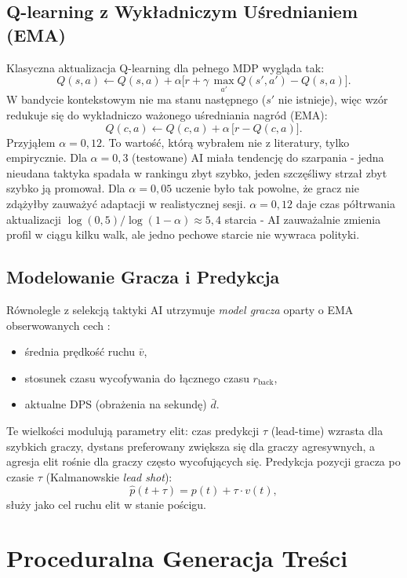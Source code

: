 \subsection{Q-learning z Wykładniczym Uśrednianiem (EMA)}

Klasyczna aktualizacja Q-learning \cite{sutton2018rl} dla pełnego MDP wygląda tak:
\[
    Q(s, a) \leftarrow Q(s, a) + \alpha \bigl[r + \gamma\, \max_{a'} Q(s', a') - Q(s, a)\bigr].
\]
W bandycie kontekstowym nie ma stanu następnego ($s'$ nie istnieje), więc wzór redukuje się do wykładniczo ważonego uśredniania nagród (EMA):
\[
    Q(c, a) \leftarrow Q(c, a) + \alpha\, \bigl[r - Q(c, a)\bigr].
\]
Przyjąłem $\alpha = 0{,}12$. To wartość, którą wybrałem nie z literatury, tylko empirycznie. Dla $\alpha = 0{,}3$ (testowane) AI miała tendencję do szarpania - jedna nieudana taktyka spadała w rankingu zbyt szybko, jeden szczęśliwy strzał zbyt szybko ją promował. Dla $\alpha = 0{,}05$ uczenie było tak powolne, że gracz nie zdążyłby zauważyć adaptacji w realistycznej sesji. $\alpha = 0{,}12$ daje czas półtrwania aktualizacji $\log(0{,}5)/\log(1-\alpha) \approx 5{,}4$ starcia - AI zauważalnie zmienia profil w ciągu kilku walk, ale jedno pechowe starcie nie wywraca polityki.

\subsection{Modelowanie Gracza i Predykcja}

Równolegle z selekcją taktyki AI utrzymuje \emph{model gracza} oparty o EMA obserwowanych cech \cite{yannakakis2013playermodeling}:
\begin{itemize}
    \item średnia prędkość ruchu $\bar{v}$,
    \item stosunek czasu wycofywania do łącznego czasu $r_\text{back}$,
    \item aktualne DPS (obrażenia na sekundę) $\bar{d}$.
\end{itemize}
Te wielkości modulują parametry elit: czas predykcji $\tau$ (lead-time) wzrasta dla szybkich graczy, dystans preferowany zwiększa się dla graczy agresywnych, a agresja elit rośnie dla graczy często wycofujących się. Predykcja pozycji gracza po czasie $\tau$ (Kalmanowskie \textit{lead shot}):
\[
    \hat{p}(t + \tau) = p(t) + \tau \cdot v(t),
\]
służy jako cel ruchu elit w stanie pościgu.

\section{Proceduralna Generacja Treści}

